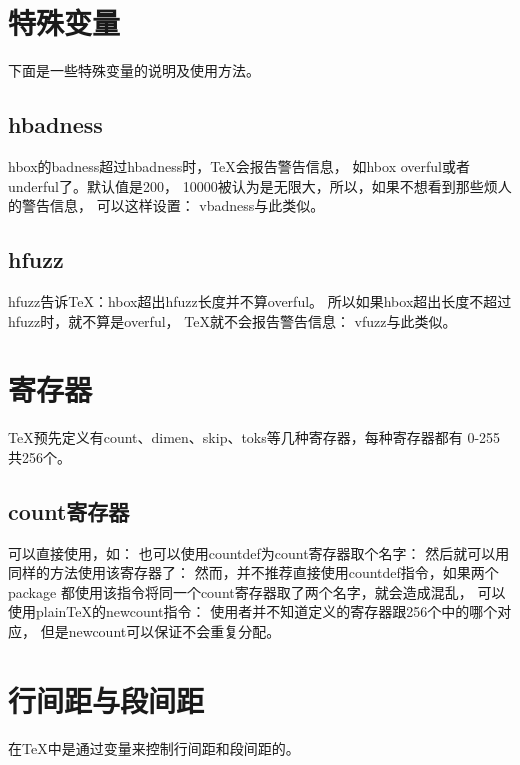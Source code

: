 ﻿\documentclass{article}
\begin{document}
  \section[特殊变量]{特殊变量}
  下面是一些特殊变量的说明及使用方法。

  \subsection[hbadness]{\bs hbadness}
  \bs hbox的badness超过hbadness时，\TeX{}会报告警告信息，
  如\bs hbox overful或者underful了。默认值是200，
  10000被认为是无限大，所以，如果不想看到那些烦人的警告信息，
  可以这样设置：
  \bs vbadness与此类似。

  \subsection[hfuzz]{\bs hfuzz}
  \bs hfuzz告诉\TeX{}：\bs hbox超出\bs hfuzz长度并不算overful。
  所以如果\bs hbox超出长度不超过\bs hfuzz时，就不算是overful，
  \TeX{}就不会报告警告信息：
  \bs vfuzz与此类似。


  \section[寄存器]{寄存器}
  \TeX{}预先定义有count、dimen、skip、toks等几种寄存器，每种寄存器都有
  0-255共256个。

  \subsection[count寄存器]{count寄存器}
  可以直接使用，如：
  也可以使用\bs countdef为count寄存器取个名字：
  然后就可以用同样的方法使用该寄存器了：
  然而，并不推荐直接使用\bs countdef指令，如果两个package
  都使用该指令将同一个count寄存器取了两个名字，就会造成混乱，
  可以使用plain\TeX{}的\bs newcount指令：
  使用者并不知道定义的寄存器跟256个中的哪个对应，
  但是\bs newcount可以保证不会重复分配。

  \section[行间距与段间距]{行间距与段间距}
  在\TeX{}中是通过变量来控制行间距和段间距的。
\end{document}
